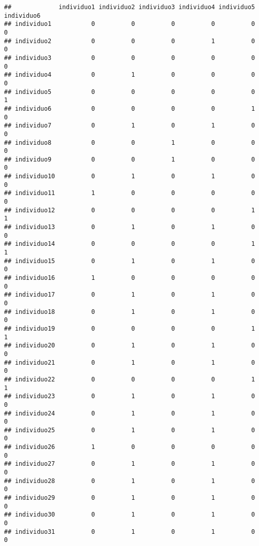 \documentclass[
]{article}
\begin{document}
\begin{verbatim}
##             individuo1 individuo2 individuo3 individuo4 individuo5 individuo6
## individuo1           0          0          0          0          0          0
## individuo2           0          0          0          1          0          0
## individuo3           0          0          0          0          0          0
## individuo4           0          1          0          0          0          0
## individuo5           0          0          0          0          0          1
## individuo6           0          0          0          0          1          0
## individuo7           0          1          0          1          0          0
## individuo8           0          0          1          0          0          0
## individuo9           0          0          1          0          0          0
## individuo10          0          1          0          1          0          0
## individuo11          1          0          0          0          0          0
## individuo12          0          0          0          0          1          1
## individuo13          0          1          0          1          0          0
## individuo14          0          0          0          0          1          1
## individuo15          0          1          0          1          0          0
## individuo16          1          0          0          0          0          0
## individuo17          0          1          0          1          0          0
## individuo18          0          1          0          1          0          0
## individuo19          0          0          0          0          1          1
## individuo20          0          1          0          1          0          0
## individuo21          0          1          0          1          0          0
## individuo22          0          0          0          0          1          1
## individuo23          0          1          0          1          0          0
## individuo24          0          1          0          1          0          0
## individuo25          0          1          0          1          0          0
## individuo26          1          0          0          0          0          0
## individuo27          0          1          0          1          0          0
## individuo28          0          1          0          1          0          0
## individuo29          0          1          0          1          0          0
## individuo30          0          1          0          1          0          0
## individuo31          0          1          0          1          0          0

\end{verbatim}
\end{document}
